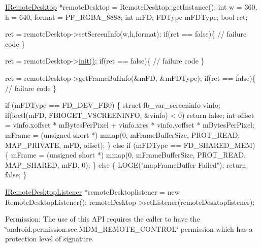 \begin{DoxyPre}	 \hyperlink{classandroid_1_1IRemoteDesktop}{IRemoteDesktop} *remoteDesktop = RemoteDesktop::getInstance();
	 int w = 360, h = 640, format = PF\_RGBA\_8888;
	 int	  mFD;
	 FDType   mFDType;
	 bool ret;\end{DoxyPre}



\begin{DoxyPre}	 ret = remoteDesktop->setScreenInfo(w,h,format);
	 if(ret == false)\{
		 // failure code
	 \}\end{DoxyPre}



\begin{DoxyPre}	 ret = remoteDesktop->\hyperlink{classandroid_1_1IRemoteDesktop_a5792cf8c7fa9eeb8e21f39927d0fed1e}{init()};
	 if(ret == false)\{
		 // failure code
	 \}\end{DoxyPre}



\begin{DoxyPre}	 ret = remoteDesktop->getFrameBufInfo(&mFD, &mFDType);
	 if(ret == false)\{
		 // failure code
	 \}\end{DoxyPre}



\begin{DoxyPre}	 if (mFDType == FD\_DEV\_FB0) \{
		 struct fb\_var\_screeninfo vinfo; 
		 if(ioctl(mFD, FBIOGET\_VSCREENINFO, &vinfo) < 0) return false;
		 int offset = vinfo.xoffset * mBytesPerPixel + vinfo.xres * vinfo.yoffset * mBytesPerPixel;
		 mFrame = (unsigned short *) mmap(0, mFrameBufferSize, PROT\_READ, MAP\_PRIVATE, mFD, offset);
	 \} else if (mFDType == FD\_SHARED\_MEM) \{
		 mFrame = (unsigned short *) mmap(0, mFrameBufferSize, PROT\_READ, MAP\_SHARED, mFD, 0);
	 \} else \{
		 LOGE("mapFrameBuffer Failed");
		 return false;
	 \}\end{DoxyPre}



\begin{DoxyPre}	 \hyperlink{classandroid_1_1IRemoteDesktopListener}{IRemoteDesktopListener} *remoteDesktoplistener = new RemoteDesktopListener();
	 remoteDesktop->setListener(remoteDesktoplistener);
 \end{DoxyPre}


\begin{DoxyParagraph}{\-Permission\-: }
\-The use of this \-A\-P\-I requires the caller to have the \char`\"{}android.\-permission.\-sec.\-M\-D\-M\-\_\-\-R\-E\-M\-O\-T\-E\-\_\-\-C\-O\-N\-T\-R\-O\-L\char`\"{} permission which has a protection level of signature.
\end{DoxyParagraph}

